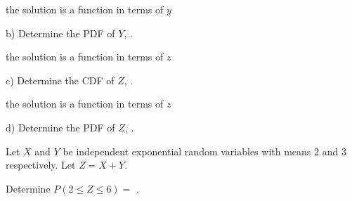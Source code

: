 \documentclass{ximera}
\begin{document}
\begin{question}
     \begin{hint}
          the solution is a function in terms of $y$
     \end{hint}
     \begin{solution}
          b) Determine the PDF of $Y$,  .
     \end{solution}
\end{question}

\begin{question}
     \begin{hint}
          the solution is a function in terms of $z$
     \end{hint}
     \begin{solution}
          c) Determine the CDF of $Z$, .
     \end{solution}
\end{question}

\begin{question}
     \begin{hint}
          the solution is a function in terms of $z$
     \end{hint}
     \begin{solution}
          d) Determine the PDF of $Z$, .
     \end{solution}
\end{question}

Let $X$ and $Y$ be independent exponential random variables with means $2$ and $3$ respectively. Let $Z=X+Y$.

\begin{question}
     \begin{solution}
          Determine $P(2\leq Z \leq 6) =$ .
     \end{solution}
\end{question}
\end{document}
